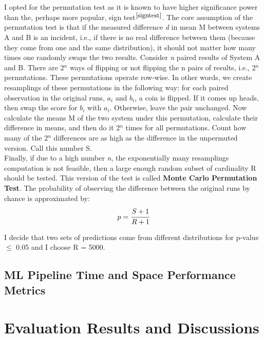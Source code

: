     I opted for the permutation test as it is known to have higher significance power than the, perhaps more popular, sign test$^{\small \cite{signtest}}$. The core assumption of the permutation test is that if the measured difference \textit{d} in mean M between systems A and B is an incident, i.e., if there is no real difference between them (because they come from one and the same distribution), it should not matter how many times one randomly swaps the two results. Consider \textit{n} paired results of System A and B. There are 2$^n$ ways of flipping or not flipping the n pairs of results, i.e., 2$^n$ permutations. These permutations operate row-wise. In other words, we create resamplings of these permutations in the following way: for each paired observation in the original runs, $a_i$ and $b_i$, a coin is flipped. If it comes up heads, then swap the score for $b_i$ with $a_i$. Otherwise, leave the pair unchanged. Now calculate the means M of the two system under this permutation, calculate their difference in means, and then do it 2$^n$ times for all permutations. Count how many of the 2$^n$ differences are as high as the difference in the unpermuted version. Call this number S. \\
    
    Finally, if due to a high number \textit{n}, the exponentially many resamplings computation is not feasible, then a large enough random subset of cardinality R should be tested. This version of the test is called \textbf{Monte Carlo Permutation Test}. The probability of observing the difference between the original runs by chance is approximated by: \\
    
    \begin{equation}
        p = \cfrac{S + 1}{R + 1}
    \end{equation}

    \smallskip
    
    I decide that two sets of predictions come from different distributions for p-value $\leq$ 0.05 and I choose R = 5000.
    
    \subsection{ML Pipeline Time and Space Performance Metrics}
    
    \section{Evaluation Results and Discussions} \label{Evaluation Results}

